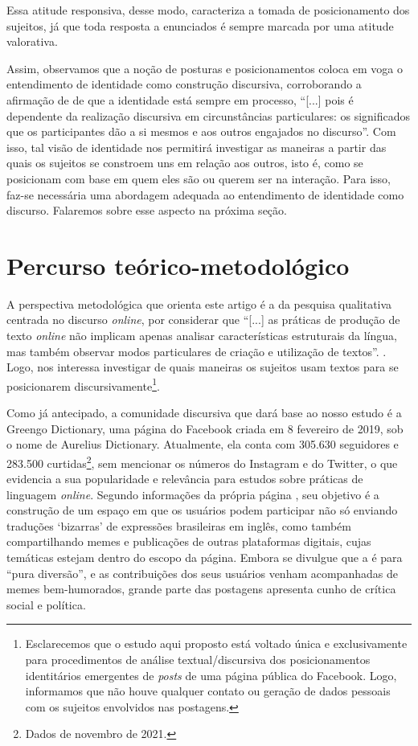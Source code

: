 \documentclass[portuguese]{textolivre}
\begin{document}
Essa atitude responsiva, desse modo, caracteriza a tomada de posicionamento dos sujeitos, já que toda resposta a enunciados é sempre marcada por uma atitude valorativa.	

Assim, observamos que a noção de posturas e posicionamentos coloca em voga o entendimento de identidade como construção discursiva, corroborando a afirmação de \textcite[p. 34]{moita_lopes_identidades_2002} de que a identidade está sempre em processo, “[...] pois é dependente da realização discursiva em circunstâncias particulares: os significados que os participantes dão a si mesmos e aos outros engajados no discurso”. Com isso, tal visão de identidade nos permitirá investigar as maneiras a partir das quais os sujeitos se constroem uns em relação aos outros, isto é, como se posicionam com base em quem eles são ou querem ser na interação. Para isso, faz-se necessária uma abordagem adequada ao entendimento de identidade como discurso. Falaremos sobre esse aspecto na próxima seção.

\section{Percurso teórico-metodológico}\label{sec-conduta}
A perspectiva metodológica que orienta este artigo é a da pesquisa qualitativa centrada no discurso \textit{online}, por considerar que “[...] as práticas de produção de texto \textit{online} não implicam apenas analisar características estruturais da língua, mas também observar modos particulares de criação e utilização de textos”. \cite[p. 221]{barton_linguagem_2015}. Logo, nos interessa investigar de quais maneiras os sujeitos usam textos para se posicionarem discursivamente\footnote{Esclarecemos que o estudo aqui proposto está voltado única e exclusivamente para procedimentos de análise textual/discursiva dos posicionamentos identitários emergentes de \textit{posts} de uma página pública do Facebook. Logo, informamos que não houve qualquer contato ou geração de dados pessoais com os sujeitos envolvidos nas postagens.}.

Como já antecipado, a comunidade discursiva que dará base ao nosso estudo é a Greengo Dictionary, uma página do Facebook criada em 8 fevereiro de 2019, sob o nome de Aurelius Dictionary. Atualmente, ela conta com 305.630 seguidores e 283.500 curtidas\footnote{Dados de novembro de 2021.}, sem mencionar os números do Instagram e do Twitter, o que evidencia a sua popularidade e relevância para estudos sobre práticas de linguagem \textit{online}. Segundo informações da própria página \cite{greengo_dictionary_sobre_2021}, seu objetivo é a construção de um espaço em que os usuários podem participar não só enviando traduções ‘bizarras’ de expressões brasileiras em inglês, como também compartilhando memes e publicações de outras plataformas digitais, cujas temáticas estejam dentro do escopo da página. Embora se divulgue que a \textcite{greengo_dictionary_sobre_2021} é para “pura diversão”, e as contribuições dos seus usuários venham acompanhadas de memes bem-humorados, grande parte das postagens apresenta cunho de crítica social e política.
\end{document}
